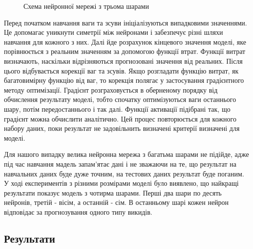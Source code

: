 \begin{figure}[H]
\begin{center}
{
            }
            \caption{Схема нейронної мережі з трьома шарами}
    \end{center}
\end{figure}

Перед початком навчання ваги та зсуви ініціалізуються випадковими значеннями. 
Це допомагає уникнути симетрії між нейронами і забезпечує різні шляхи навчання для кожного з них. 
Далі йде розрахунок кінцевого значення моделі, яке порівнюється з реальним значенням за допомогою функції втрат. 
Функції витрат визначають, наскільки відрізняються прогнозовані значення від реальних. 
Після цього відбувається корекції ваг та зсувів. 
Якщо розгладати функцію витрат, як багатовимірну функцію від ваг, то корекція полягає у застосування градієнтного методу оптимізації. 
Градієнт розграховується в оберненому порядку від обчислення результату моделі, тобто спочатку оптимізуються ваги останнього шару, потім передостаннього і так далі. 
Функції активації підібрані так, що градієнт можна обчислити аналітично. 
Цей процес повторюється для кожного набору даних, поки результат не задовільнить визначені критерії визначені для моделі. 

Для нашого випадку велика нейронна мережа з багатьма шарами не підійде, адже під час навчання мадель запам'ятає дані і не зважаючи на те, що результат на навчальних даних буде дуже точним, на тестових даних результат буде поганим. 
У ході експериментів з різними розмірами моделі було виявлено, що найкращі результати показує модель з чотирма шарами. 
Перші два шари по десять нейронів, третій - вісім, а останній - сім. 
В останньому шарі кожен нейрон відповідає за прогнозування одного типу викидів. 

\subsection{Результати}

